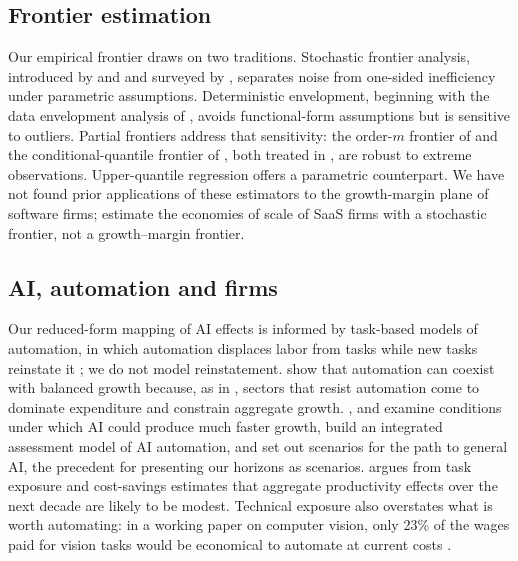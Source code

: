 \subsection{Frontier estimation}

Our empirical frontier draws on two traditions. Stochastic frontier analysis, introduced by \citet{aigner1977formulation} and \citet{meeusen1977efficiency} and surveyed by \citet{kumbhakar2000stochastic}, separates noise from one-sided inefficiency under parametric assumptions. Deterministic envelopment, beginning with the data envelopment analysis of \citet{charnes1978measuring}, avoids functional-form assumptions but is sensitive to outliers. Partial frontiers address that sensitivity: the order-$m$ frontier of \citet{cazals2002nonparametric} and the conditional-quantile frontier of \citet{aragon2005nonparametric}, both treated in \citet{daraio2007advanced}, are robust to extreme observations. Upper-quantile regression \citep{koenker1978regression} offers a parametric counterpart. We have not found prior applications of these estimators to the growth-margin plane of software firms; \citet{ge2014analyzing} estimate the economies of scale of SaaS firms with a stochastic frontier, not a growth--margin frontier.

\subsection{AI, automation and firms}

Our reduced-form mapping of AI effects is informed by task-based models of automation, in which automation displaces labor from tasks while new tasks reinstate it \citep{acemoglu2018race}; we do not model reinstatement. \citet{aghion2019artificial} show that automation can coexist with balanced growth because, as in \citet{baumol1967macroeconomics}, sectors that resist automation come to dominate expenditure and constrain aggregate growth. \citet{trammell2023economic}, \citet{davidson2021could} and \citet{erdil2023explosive} examine conditions under which AI could produce much faster growth, \citet{epoch2025gate} build an integrated assessment model of AI automation, and \citet{korinek2024scenarios} set out scenarios for the path to general AI, the precedent for presenting our horizons as scenarios. \citet{acemoglu2025simple} argues from task exposure and cost-savings estimates that aggregate productivity effects over the next decade are likely to be modest. Technical exposure also overstates what is worth automating: in a working paper on computer vision, only 23\% of the wages paid for vision tasks would be economical to automate at current costs \citep{svanberg2024beyond}.

